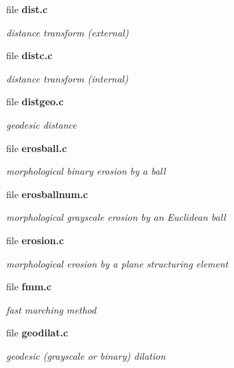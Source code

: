 \begin{CompactItemize}
\item 
file {\bf dist.c}
\begin{CompactList}\small\item\em distance transform (external) \item\end{CompactList}

\item 
file {\bf distc.c}
\begin{CompactList}\small\item\em distance transform (internal) \item\end{CompactList}

\item 
file {\bf distgeo.c}
\begin{CompactList}\small\item\em geodesic distance \item\end{CompactList}

\item 
file {\bf erosball.c}
\begin{CompactList}\small\item\em morphological binary erosion by a ball \item\end{CompactList}

\item 
file {\bf erosballnum.c}
\begin{CompactList}\small\item\em morphological grayscale erosion by an Euclidean ball \item\end{CompactList}

\item 
file {\bf erosion.c}
\begin{CompactList}\small\item\em morphological erosion by a plane structuring element \item\end{CompactList}

\item 
file {\bf fmm.c}
\begin{CompactList}\small\item\em fast marching method \item\end{CompactList}

\item 
file {\bf geodilat.c}
\begin{CompactList}\small\item\em geodesic (grayscale or binary) dilation \item\end{CompactList}


\end{CompactItemize}
